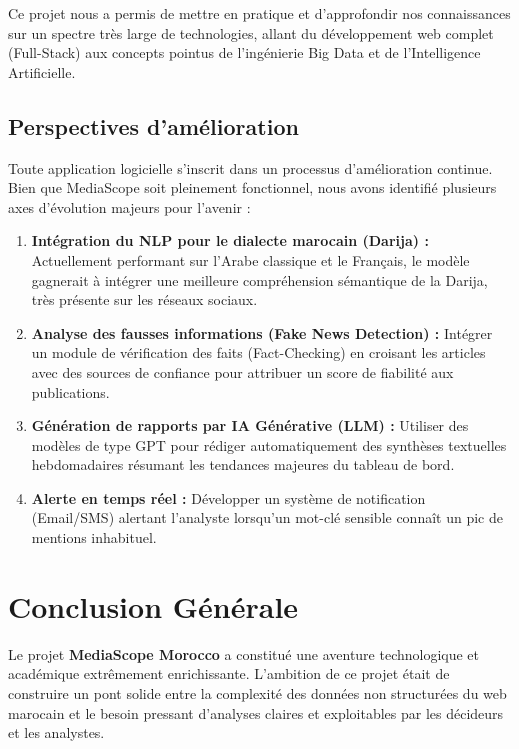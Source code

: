 \documentclass[12pt,a4paper,oneside]{report}
\begin{document}
Ce projet nous a permis de mettre en pratique et d'approfondir nos connaissances sur un spectre très large de technologies, allant du développement web complet (Full-Stack) aux concepts pointus de l'ingénierie Big Data et de l'Intelligence Artificielle.

\section{Perspectives d'amélioration}
Toute application logicielle s'inscrit dans un processus d'amélioration continue. Bien que MediaScope soit pleinement fonctionnel, nous avons identifié plusieurs axes d'évolution majeurs pour l'avenir :

\begin{enumerate}[label=\textbf{\arabic*.}, itemsep=10pt]
    \item \textbf{Intégration du NLP pour le dialecte marocain (Darija) :} Actuellement performant sur l'Arabe classique et le Français, le modèle gagnerait à intégrer une meilleure compréhension sémantique de la Darija, très présente sur les réseaux sociaux.
    \item \textbf{Analyse des fausses informations (Fake News Detection) :} Intégrer un module de vérification des faits (Fact-Checking) en croisant les articles avec des sources de confiance pour attribuer un score de fiabilité aux publications.
    \item \textbf{Génération de rapports par IA Générative (LLM) :} Utiliser des modèles de type GPT pour rédiger automatiquement des synthèses textuelles hebdomadaires résumant les tendances majeures du tableau de bord.
    \item \textbf{Alerte en temps réel :} Développer un système de notification (Email/SMS) alertant l'analyste lorsqu'un mot-clé sensible connaît un pic de mentions inhabituel.
\end{enumerate}

\newpage

\chapter*{Conclusion Générale}

Le projet \textbf{MediaScope Morocco} a constitué une aventure technologique et académique extrêmement enrichissante. L'ambition de ce projet était de construire un pont solide entre la complexité des données non structurées du web marocain et le besoin pressant d'analyses claires et exploitables par les décideurs et les analystes.
\end{document}
